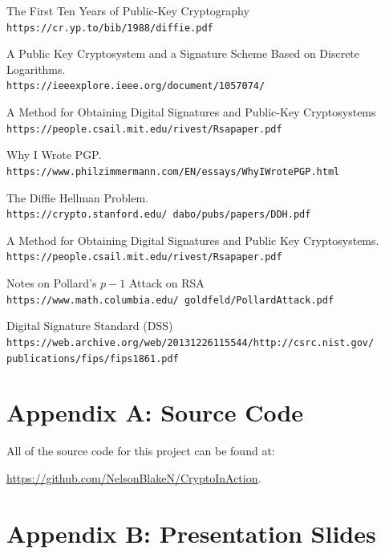 \documentclass[12pt]{report}
\begin{document}
\begin{thebibliography}{9}

    The First Ten Years of Public-Key Cryptography\\
    \texttt{https://cr.yp.to/bib/1988/diffie.pdf}
    
    A Public Key Cryptosystem and a Signature Scheme Based on Discrete Logarithms.\\
    \texttt{https://ieeexplore.ieee.org/document/1057074/}

    A Method for Obtaining Digital Signatures and Public-Key Cryptosystems\\
    \texttt{https://people.csail.mit.edu/rivest/Rsapaper.pdf}
    
    Why I Wrote PGP.\\
    \texttt{https://www.philzimmermann.com/EN/essays/WhyIWrotePGP.html}
    
    The Diffie Hellman Problem.\\
    \texttt{https://crypto.stanford.edu/~dabo/pubs/papers/DDH.pdf}
    
    A Method for Obtaining Digital Signatures and Public Key Cryptosystems.\\
    \texttt{https://people.csail.mit.edu/rivest/Rsapaper.pdf}

    Notes on Pollard's $p-1$ Attack on RSA\\
    \texttt{https://www.math.columbia.edu/~goldfeld/PollardAttack.pdf}

    Digital Signature Standard (DSS)\\
    \texttt{https://web.archive.org/web/20131226115544/http://csrc.nist.gov/\\publications/fips/fips1861.pdf}

\end{thebibliography}

\newpage
\section{Appendix A: Source Code}
All of the source code for this project can be found at:

\href{https://github.com/NelsonBlakeN/CryptoInAction}{https://github.com/NelsonBlakeN/CryptoInAction}.

\newpage
\section{Appendix B: Presentation Slides}
\end{document}
